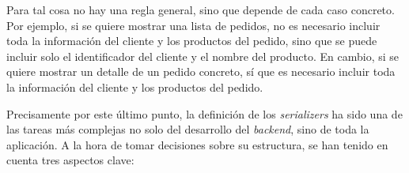 Para tal cosa no hay una regla general, sino que depende de cada caso concreto. Por ejemplo, si se quiere mostrar una lista de pedidos, no es necesario incluir toda la información del cliente y los productos del pedido, sino que se puede incluir solo el identificador del cliente y el nombre del producto. En cambio, si se quiere mostrar un detalle de un pedido concreto, sí que es necesario incluir toda la información del cliente y los productos del pedido.

\begin{center}
    \captionsetup{type=lstlisting, aboveskip=2mm, belowskip=2mm}
    \setlength{\fboxsep}{1pt}
    \begin{minipage}[t]{0.48\textwidth}
        
    \end{minipage}
    \hfill
    \begin{minipage}[t]{0.48\textwidth}
        
    \end{minipage}
    \vspace{2mm}
    \label{lst:serializer_json}
\end{center}

Precisamente por este último punto, la definición de los \textit{serializers} ha sido una de las tareas más complejas no solo del desarrollo del \textit{backend}, sino de toda la aplicación. A la hora de tomar decisiones sobre su estructura, se han tenido en cuenta tres aspectos clave:

